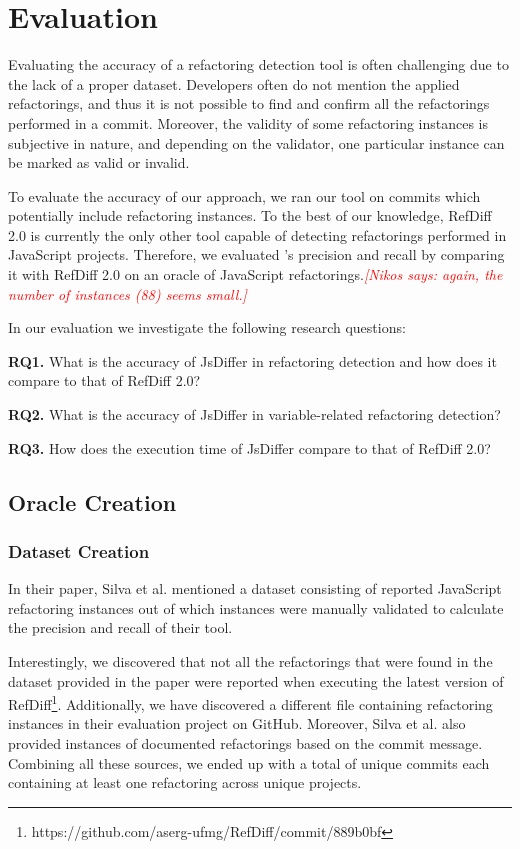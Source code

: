 \documentclass[letterpaper,12pt,onecolumn,final]{report}
\newcommand{\nikos}[1]{\textcolor{red}{{\it [Nikos says: #1]}}}
\begin{document}
\chapter{Evaluation}

Evaluating the accuracy of a refactoring detection tool is often challenging due to the lack of a proper dataset. Developers often do not mention the applied refactorings, and thus it is not possible to find and confirm all the refactorings performed in a commit. Moreover, the validity of some refactoring instances is subjective in nature, and depending on the validator, one particular instance can be marked as valid or invalid.

To evaluate the accuracy of our approach, we ran our tool on \evTotalCommits{} commits which potentially include refactoring instances. To the best of our knowledge, RefDiff 2.0 \cite{Silva2020} is currently the only other tool capable of detecting refactorings performed in JavaScript projects. Therefore, we evaluated \toolname{}'s precision and recall by comparing it with RefDiff 2.0 on an oracle of \oracleValidatedInstances{} JavaScript refactorings.\nikos{again, the number of instances (88) seems small.}

In our evaluation we investigate the following research questions:

\textbf{RQ1.} What is the accuracy of JsDiffer in refactoring detection and how does it compare to that of RefDiff 2.0?

\textbf{RQ2.} What is the accuracy of JsDiffer in variable-related refactoring detection?

\textbf{RQ3.} How does the execution time of JsDiffer compare to that of RefDiff 2.0?

\section {Oracle Creation}

\subsection {Dataset Creation}
In their paper, Silva et al. \cite{Silva2020} mentioned a dataset consisting of \evRefDiffReportedCount{} reported JavaScript refactoring instances out of which \evRefDiffValidatedCount{} instances were manually validated to calculate the precision and recall of their tool.

Interestingly, we discovered that not all the refactorings that were found in the dataset provided in the paper were reported when executing the latest version of RefDiff\footnote{https://github.com/aserg-ufmg/RefDiff/commit/889b0bf}. Additionally, we have discovered a different file containing \evRefDiffJsDataCsvCount{} refactoring instances in their evaluation project on GitHub. Moreover, Silva et al. also provided  \evRefDiffDocumentedCount{} instances of documented refactorings based on the commit message. Combining all these sources, we ended up with a total of \evTotalCommits{} unique commits each containing at least one refactoring across \evTotalProjectCounts{} unique projects.
\end{document}
